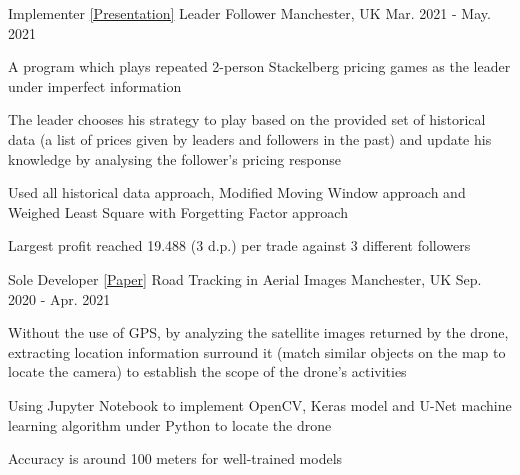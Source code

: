 \begin{cventries}
  \cventry
    {Implementer \href{https://github.com/Zhayu517/Resume/blob/main/source/resume/Leader\%20Follower.pdf}{[Presentation]}} %
    {Leader Follower} %
    {Manchester, UK} %
    {Mar. 2021 - May. 2021} %
    {
      \begin{cvitems} %
        \item {A program which plays repeated 2-person Stackelberg pricing games as the leader
               under imperfect information}
        \item {The leader chooses his strategy to play based on the provided set of historical data (a          list of prices given by leaders and followers in the past) and update his knowledge by           analysing the follower's pricing response}
        \item {Used all historical data approach, Modified Moving Window approach and Weighed Least             Square with Forgetting Factor approach}
        \item {Largest profit reached 19.488 (3 d.p.) per trade against 3 different followers}
      \end{cvitems}
    }

  \cventry
    {Sole Developer \href{https://github.com/Zhayu517/Resume/blob/main/source/resume/Road\%20Tracking\%20in\%20Aerial\%20Images.pdf}{[Paper]}} %
    {Road Tracking in Aerial Images} %
    {Manchester, UK} %
    {Sep. 2020 - Apr. 2021} %
    {
      \begin{cvitems} %
        \item {Without the use of GPS, by analyzing the satellite images returned by the drone, extracting location information surround it (match similar objects on the map to locate the camera) to establish the scope of the drone's activities}
        \item {Using Jupyter Notebook to implement OpenCV, Keras model and U-Net machine learning algorithm under Python to locate the drone}
        \item {Accuracy is around 100 meters for well-trained models}
      \end{cvitems}
    }


\end{cventries}
